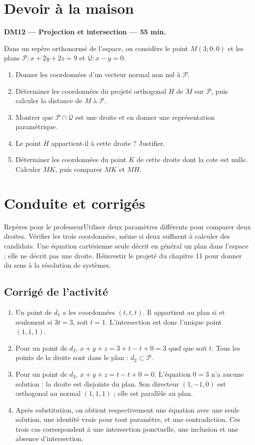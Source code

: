 \section{Devoir à la maison}\textbf{DM12 --- Projection et intersection --- 55 min.}\par Dans un repère orthonormé de l'espace, on considère le point $M(3;0;0)$ et les plans $\mathcal P:x+2y+2z=9$ et $\mathcal Q:x-y=0$.
\begin{enumerate}\item Donner les coordonnées d'un vecteur normal non nul à $\mathcal P$.
\item Déterminer les coordonnées du projeté orthogonal $H$ de $M$ sur $\mathcal P$, puis calculer la distance de $M$ à $\mathcal P$.
\item Montrer que $\mathcal P\cap\mathcal Q$ est une droite et en donner une représentation paramétrique.
\item Le point $H$ appartient-il à cette droite ? Justifier.
\item Déterminer les coordonnées du point $K$ de cette droite dont la cote est nulle. Calculer $MK$, puis comparer $MK$ et $MH$.\end{enumerate}

\ifprof\clearpage\section{Conduite et corrigés}\begin{profbox}{Repères pour le professeur}Utiliser deux paramètres différents pour comparer deux droites. Vérifier les trois coordonnées, même si deux suffisent à calculer des candidats. Une équation cartésienne seule décrit en général un plan dans l'espace ; elle ne décrit pas une droite. Réinvestir le projeté du chapitre 11 pour donner du sens à la résolution de systèmes.\end{profbox}

\subsection{Corrigé de l'activité}\begin{enumerate}
\item Un point de $d_1$ a les coordonnées $(t,t,t)$. Il appartient au plan si et seulement si $3t=3$, soit $t=1$. L'intersection est donc l'unique point $(1,1,1)$.
\item Pour un point de $d_2$, $x+y+z=3+t-t+0=3$ quel que soit $t$. Tous les points de la droite sont dans le plan : $d_2\subset\mathcal P$.
\item Pour un point de $d_3$, $x+y+z=t-t+0=0$. L'équation $0=3$ n'a aucune solution : la droite est disjointe du plan. Son directeur $(1,-1,0)$ est orthogonal au normal $(1,1,1)$ ; elle est parallèle au plan.
\item Après substitution, on obtient respectivement une équation avec une seule solution, une identité vraie pour tout paramètre, et une contradiction. Ces trois cas correspondent à une intersection ponctuelle, une inclusion et une absence d'intersection.
\end{enumerate}

